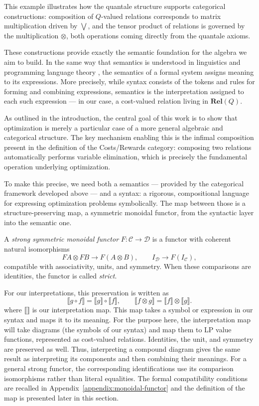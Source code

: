 This example illustrates how the quantale structure supports 
categorical constructions: composition of $Q$-valued relations 
corresponds to matrix multiplication driven by $\bigvee$,
and the tensor product of relations is governed by the multiplication $\otimes$,
both operations coming directly from the quantale axioms.

These constructions provide exactly the semantic foundation for the algebra we aim to build.
In the same way that semantics is understood in linguistics and programming language
theory \cite{winskel1993formal}, the semantics of a formal system assigns meaning 
to its expressions. More precisely, while syntax consists of the tokens and rules for 
forming and combining expressions, semantics is the interpretation assigned to each
such expression — in our case, a cost-valued relation living in $\mathbf{Rel}(Q)$.

As outlined in the introduction, the central goal of this work is to show that
optimization is merely a particular case of a more general algebraic and categorical structure.
The key mechanism enabling this is the infimal composition present in the definition
of the Costs/Rewards category: composing two relations automatically performs variable
elimination, which is precisely the fundamental operation underlying optimization.

To make this precise,
we need both a semantics — provided by the categorical framework developed above —
and a syntax: a rigorous, compositional language for expressing optimization problems
symbolically. The map between those is a structure-preserving map, a symmetric monoidal
functor, from the syntactic layer into the semantic one.

\begin{definition}\label{def:main-monoidal-functor}
A \emph{strong symmetric monoidal functor} $F:\mathcal C\to\mathcal D$ is a
functor with coherent natural isomorphisms
\[
 FA\otimes FB\longrightarrow F(A\otimes B),
 \qquad I_{\mathcal D}\longrightarrow F(I_{\mathcal C}),
\]
compatible with associativity, units, and symmetry. When these comparisons
are identities, the functor is called \emph{strict}.
\end{definition}

For our interpretations, this preservation is written as
\[
 \llbracket g\circ f\rrbracket
 =\llbracket g\rrbracket\circ\llbracket f\rrbracket,
 \qquad
 \llbracket f\otimes g\rrbracket
 =\llbracket f\rrbracket\otimes\llbracket g\rrbracket.
\]
where $\llbracket \rrbracket$ is our interpretation map.
This map takes a symbol or expression in our syntax and maps it to its meaning.
For the purpose here, the interpretation map will take diagrams
(the symbols of our syntax) and map them to LP value functions, represented as
cost-valued relations. 
Identities, the unit, and symmetry are preserved as well. Thus, interpreting
a compound diagram gives the same result as interpreting its components and
then combining their meanings. For a general strong functor, the corresponding
identifications use its comparison isomorphisms rather than literal equalities.
The formal compatibility conditions are recalled in
Appendix~\ref{appendix:monoidal-functor} and the definition of the map is presented
later in this section.


